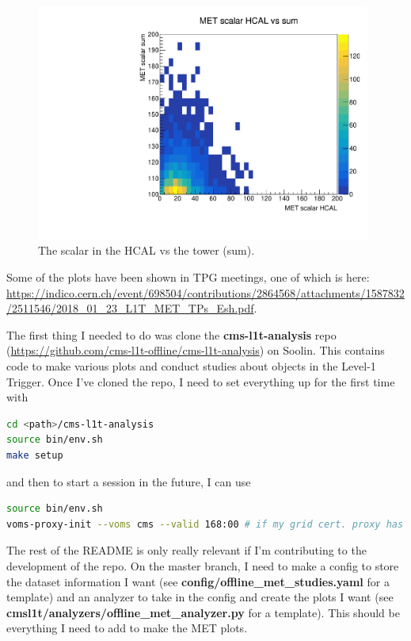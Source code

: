 \begin{figure}[htbp]
\centering
\includegraphics[width=110mm]{./sec34/MET_studies_v6/Plots/MetScalHcaltotal.pdf}
\caption{The \etmiss scalar in the HCAL vs the tower (sum).}
\end{figure}

Some of the plots have been shown in TPG meetings, one of which is here: \url{https://indico.cern.ch/event/698504/contributions/2864568/attachments/1587832/2511546/2018_01_23_L1T_MET_TPs_Esh.pdf}.



\if
The first thing I needed to do was clone the \textbf{cms-l1t-analysis} repo (\url{https://github.com/cms-l1t-offline/cms-l1t-analysis}) on Soolin. This contains code to make various plots and conduct studies about objects in the Level-1 Trigger. Once I've cloned the repo, I need to set everything up for the first time with

\begin{lstlisting}[belowskip=-0.7cm, language=sh, numbers=none]
cd <path>/cms-l1t-analysis
source bin/env.sh
make setup
\end{lstlisting}

and then to start a session in the future, I can use

\begin{lstlisting}[belowskip=-0.7cm, language=sh, numbers=none]
source bin/env.sh
voms-proxy-init --voms cms --valid 168:00 # if my grid cert. proxy has expired
\end{lstlisting}

The rest of the README is only really relevant if I'm contributing to the development of the repo. On the master branch, I need to make a config to store the dataset information I want (see \textbf{config/offline\_met\_studies.yaml} for a template) and an analyzer to take in the config and create the plots I want (see \textbf{cmsl1t/analyzers/offline\_met\_analyzer.py} for a template). This should be everything I need to add to make the MET plots.

